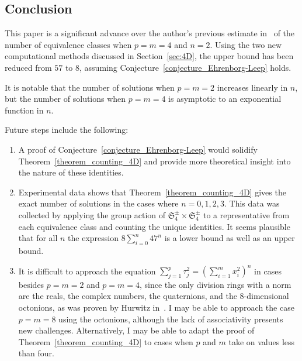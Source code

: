 \documentclass[12pt,table]{article}
\numberwithin{equation}{section}
\begin{document}
\begin{landscape}
{{\section{Conclusion}



This paper is a significant advance
over the author's previous
estimate 
in~\cite{Ehrenborg_2018}
of the number of equivalence classes
when
$p = m = 4$ and $n=2$. Using the two
new computational methods discussed
in Section~\ref{sec:4D}, the upper bound
has been reduced from $57$ to $8$,
assuming Conjecture~\ref{conjecture_Ehrenborg-Leep}
holds.

It is notable that the number of solutions
when $p = m = 2$ increases linearly in
$n$, but the number of solutions
when $p = m = 4$
is asymptotic to an
exponential
function
in $n$.

Future steps include the following:
\begin{enumerate}
\item A proof of
Conjecture~\ref{conjecture_Ehrenborg-Leep}
would solidify Theorem~\ref{theorem_counting_4D}
and provide more theoretical insight
into the nature of these identities.
\item Experimental data shows that 
Theorem~\ref{theorem_counting_4D}
gives the exact number of solutions
in the cases where $n = 0, 1, 2, 3$.
This data was collected by applying the
group action of
$ \mathfrak{S}_4^\pm \times \mathfrak{S}_4^\pm $
to a representative from each equivalence
class and counting the unique identities.
It seems plausible that for all $n$
the expression  $ 8 \sum_{i = 0}^n{47^n} $ is
a lower bound as well as an upper bound.
\item It is difficult to approach the equation
$ \sum_{j = 1}^{p} \tau_j ^ 2 = \left( \sum_{i = 1}^{m} x_i ^ 2 \right) ^ n $
in cases besides $p = m = 2$ and $p = m = 4$, since
the only division rings with a norm are the reals, the complex
numbers, the quaternions, and the $8$-dimensional
octonions, as was proven by Hurwitz in~\cite{Hurwitz}.
I may be able to approach the case $p = m = 8$
using the octonions,
although the lack of associativity presents
new challenges.
Alternatively, I may be able to adapt
the proof of Theorem~\ref{theorem_counting_4D} to
cases when $p$ and $m$ take on values
less than four.
\end{enumerate}


\newcommand{\journal}[6]{{\sc #1,} #2, {\it #3} {\bf #4} (#5), #6.}
\newcommand{\preprint}[3]{{\sc #1,} #2, preprint #3.}
\newcommand{\book}[4]{{\sc #1,} #2, #3, #4.}
\newcommand{\collection}[6]{{\sc #1,}  #2, #3, in {\it #4}, #5, #6.}
\newcommand{\JCTA}{J.\ Combin.\ Theory Ser.\ A}
\newcommand{\arxiv}[3]{{\sc #1,} #2, {\tt #3}.}
\newcommand{\article}[3]{{\sc #1,} #2, {\tt #3}.}
\newcommand{\journalfive}[5]{{\sc #1,} #2, {\it #3}  (#4), #5.}





}}
\end{landscape}
\end{document}
